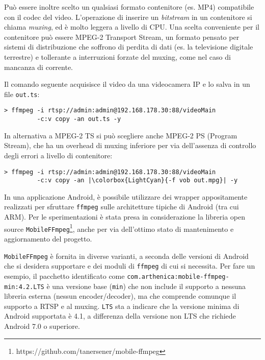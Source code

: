 Può essere inoltre scelto un qualsiasi formato contenitore (es. MP4) compatibile con il codec del video. L'operazione di inserire un \emph{bitstream} in un contenitore si chiama \emph{muxing}, ed è molto leggera a livello di CPU. Una scelta conveniente per il contenitore può essere MPEG-2 Transport Stream, un formato pensato per sistemi di distribuzione che soffrono di perdita di dati (es. la televisione digitale terrestre) e tollerante a interruzioni forzate del muxing, come nel caso di mancanza di corrente.

Il comando seguente acquisisce il video da una videocamera IP e lo salva in un file \texttt{out.ts}:

\begin{verbatim}
> ffmpeg -i rtsp://admin:admin@192.168.178.30:88/videoMain
         -c:v copy -an out.ts -y
\end{verbatim}

In alternativa a MPEG-2 TS si può scegliere anche MPEG-2 PS (Program Stream), che ha un overhead di muxing inferiore per via dell'assenza di controllo degli errori a livello di contenitore:

\begin{verbatim}
> ffmpeg -i rtsp://admin:admin@192.168.178.30:88/videoMain
         -c:v copy -an |\colorbox{LightCyan}{-f vob out.mpg}| -y
\end{verbatim}

In una applicazione Android, è possibile utilizzare dei wrapper appositamente realizzati per sfruttare \texttt{ffmpeg} sulle architetture tipiche di Android (tra cui ARM). Per le sperimentazioni è stata presa in considerazione la libreria open source \texttt{MobileFFmpeg}\footnote{https://github.com/tanersener/mobile-ffmpeg}, anche per via dell'ottimo stato di mantenimento e aggiornamento del progetto.

\texttt{MobileFFmpeg} è fornita in diverse varianti, a seconda delle versioni di Android che si desidera supportare e dei moduli di \texttt{ffmpeg} di cui si necessita. Per fare un esempio, il pacchetto identificato come \texttt{com.arthenica:mobile-ffmpeg-min:4.2.LTS} è una versione base (\texttt{min}) che non include il supporto a nessuna libreria esterna (nessun encoder/decoder), ma che comprende comunque il supporto a RTSP e al muxing. \texttt{LTS} sta a indicare che la versione minima di Android supportata è 4.1, a differenza della versione non LTS che richiede Android 7.0 o superiore.

